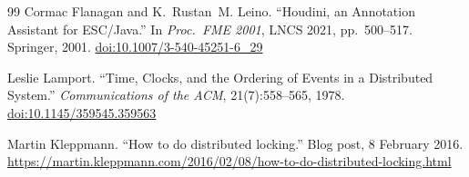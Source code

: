 \documentclass[11pt,a4paper]{article}
\begin{document}
{\begin{thebibliography}{99}
Cormac Flanagan and K.~Rustan~M. Leino. ``Houdini, an Annotation Assistant for ESC/Java.'' In \emph{Proc.\ FME 2001}, LNCS 2021, pp.\ 500--517. Springer, 2001. \href{https://doi.org/10.1007/3-540-45251-6_29}{doi:10.1007/3-540-45251-6\_29}

Leslie Lamport. ``Time, Clocks, and the Ordering of Events in a Distributed System.'' \emph{Communications of the ACM}, 21(7):558--565, 1978. \href{https://doi.org/10.1145/359545.359563}{doi:10.1145/359545.359563}

Martin Kleppmann. ``How to do distributed locking.'' Blog post, 8 February 2016. \url{https://martin.kleppmann.com/2016/02/08/how-to-do-distributed-locking.html}

\end{thebibliography}
}
\end{document}
